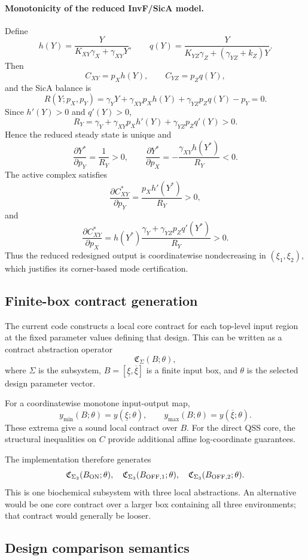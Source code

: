 \paragraph{Monotonicity of the reduced InvF/SicA model.}
Define
\[
h(Y)=\frac{Y}{K_{XY}\gamma_X+\gamma_{XY}Y},\qquad
q(Y)=\frac{Y}{K_{YZ}\gamma_Z+(\gamma_{YZ}+k_Z)Y}.
\]
Then
\[
C_{XY}=p_Xh(Y),\qquad C_{YZ}=p_Zq(Y),
\]
and the SicA balance is
\[
R(Y;p_X,p_Y)
=
\gamma_YY+\gamma_{XY}p_Xh(Y)
+\gamma_{YZ}p_Zq(Y)-p_Y=0.
\]
Since $h'(Y)>0$ and $q'(Y)>0$,
\[
R_Y=
\gamma_Y+\gamma_{XY}p_Xh'(Y)+\gamma_{YZ}p_Zq'(Y)>0.
\]
Hence the reduced steady state is unique and
\[
\frac{\partial Y^*}{\partial p_Y}=\frac{1}{R_Y}>0,\qquad
\frac{\partial Y^*}{\partial p_X}
=-\frac{\gamma_{XY}h(Y^*)}{R_Y}<0.
\]
The active complex satisfies
\[
\frac{\partial C_{XY}^*}{\partial p_Y}
=
\frac{p_Xh'(Y^*)}{R_Y}>0,
\]
and
\[
\frac{\partial C_{XY}^*}{\partial p_X}
=
h(Y^*)
\frac{\gamma_Y+\gamma_{YZ}p_Zq'(Y^*)}{R_Y}>0.
\]
Thus the reduced redesigned output is coordinatewise nondecreasing in
$(\xi_1,\xi_2)$, which justifies its corner-based mode certification.

\subsection{Finite-box contract generation}

The current code constructs a local core contract for each top-level input
region at the fixed parameter values defining that design. This can be written
as a contract abstraction operator
\[
\mathfrak C_{\Sigma}(B;\theta),
\]
where $\Sigma$ is the subsystem, $B=[\underline\xi,\overline\xi]$ is a finite
input box, and $\theta$ is the selected design parameter vector.

For a coordinatewise monotone input-output map,
\[
y_{\min}(B;\theta)=y(\underline\xi;\theta),\qquad
y_{\max}(B;\theta)=y(\overline\xi;\theta).
\]
These extrema give a sound local contract over $B$. For the direct QSS core,
the structural inequalities on $C$ provide additional affine log-coordinate
guarantees.

The implementation therefore generates
\[
\mathfrak C_{\Sigma_3}(B_{\rm ON};\theta),\quad
\mathfrak C_{\Sigma_3}(B_{\rm OFF,1};\theta),\quad
\mathfrak C_{\Sigma_3}(B_{\rm OFF,2};\theta).
\]
This is one biochemical subsystem with three local abstractions. An alternative
would be one core contract over a larger box containing all three environments;
that contract would generally be looser.

\subsection{Design comparison semantics}

